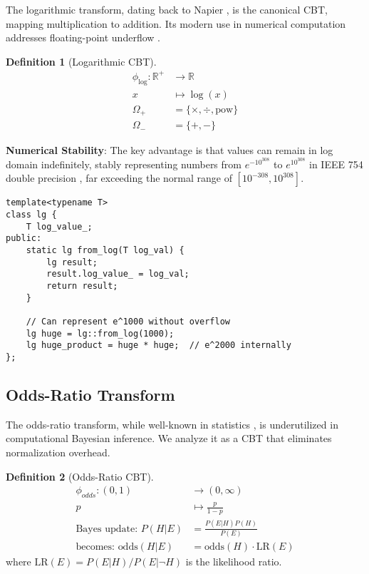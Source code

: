 \documentclass[12pt,a4paper]{article}
\theoremstyle{definition}
\newtheorem{definition}{Definition}
\begin{document}
The logarithmic transform, dating back to Napier \cite{napier1614mirifici}, is the canonical CBT, mapping multiplication to addition. Its modern use in numerical computation addresses floating-point underflow \cite{goldberg1991every}.

\begin{definition}[Logarithmic CBT]
\begin{align}
\phi_{\log}: \mathbb{R}^+ &\to \mathbb{R} \\
x &\mapsto \log(x) \\
\Omega_+ &= \{\times, \div, \text{pow}\} \\
\Omega_- &= \{+, -\}
\end{align}
\end{definition}

\textbf{Numerical Stability}: The key advantage is that values can remain in log domain indefinitely, stably representing numbers from $e^{-10^{308}}$ to $e^{10^{308}}$ in IEEE 754 double precision \cite{ieee754}, far exceeding the normal range of $[10^{-308}, 10^{308}]$.

\begin{lstlisting}[caption={Extended range in logarithmic domain}]
template<typename T>
class lg {
    T log_value_;
public:
    static lg from_log(T log_val) {
        lg result;
        result.log_value_ = log_val;
        return result;
    }
    
    // Can represent e^1000 without overflow
    lg huge = lg::from_log(1000);
    lg huge_product = huge * huge;  // e^2000 internally
};
\end{lstlisting}

\subsection{Odds-Ratio Transform}

The odds-ratio transform, while well-known in statistics \cite{agresti2003categorical}, is underutilized in computational Bayesian inference. We analyze it as a CBT that eliminates normalization overhead.

\begin{definition}[Odds-Ratio CBT]
\begin{align}
\phi_{odds}: (0,1) &\to (0,\infty) \\
p &\mapsto \frac{p}{1-p} \\
\text{Bayes update: } P(H|E) &= \frac{P(E|H)P(H)}{P(E)} \\
\text{becomes: } \text{odds}(H|E) &= \text{odds}(H) \cdot \text{LR}(E)
\end{align}
where $\text{LR}(E) = P(E|H)/P(E|\neg H)$ is the likelihood ratio.
\end{definition}
\end{document}
